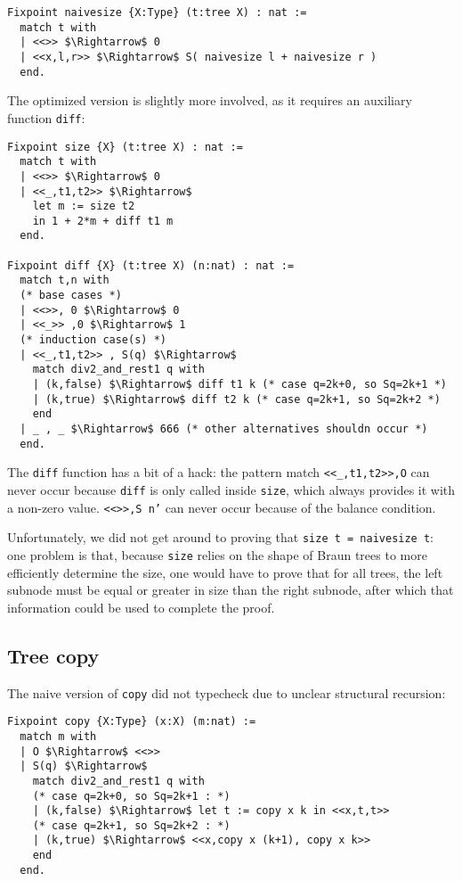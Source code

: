 \documentclass[a4paper,10pt]{article}
\begin{document}
\begin{lstlisting}[mathescape=true]
Fixpoint naivesize {X:Type} (t:tree X) : nat :=
  match t with
  | <<>> $\Rightarrow$ 0
  | <<x,l,r>> $\Rightarrow$ S( naivesize l + naivesize r )
  end.
\end{lstlisting}

The optimized version is slightly more involved, as it requires an auxiliary function \texttt{diff}:

\begin{lstlisting}[mathescape=true]
Fixpoint size {X} (t:tree X) : nat :=
  match t with
  | <<>> $\Rightarrow$ 0
  | <<_,t1,t2>> $\Rightarrow$ 
    let m := size t2 
    in 1 + 2*m + diff t1 m
  end.

Fixpoint diff {X} (t:tree X) (n:nat) : nat :=
  match t,n with
  (* base cases *)
  | <<>>, 0 $\Rightarrow$ 0
  | <<_>> ,0 $\Rightarrow$ 1
  (* induction case(s) *)
  | <<_,t1,t2>> , S(q) $\Rightarrow$ 
    match div2_and_rest1 q with
    | (k,false) $\Rightarrow$ diff t1 k (* case q=2k+0, so Sq=2k+1 *)
    | (k,true) $\Rightarrow$ diff t2 k (* case q=2k+1, so Sq=2k+2 *)
    end
  | _ , _ $\Rightarrow$ 666 (* other alternatives shouldn occur *)
  end.
\end{lstlisting}

The \texttt{diff} function has a bit of a hack: the pattern match \texttt{<<\_,t1,t2>>,O} can never occur because \texttt{diff} is only called inside \texttt{size}, which always provides it with a non-zero value.
\texttt{<<>>,S n'} can never occur because of the balance condition.

Unfortunately, we did not get around to proving that \texttt{size t = naivesize t}: one problem is that, because \texttt{size} relies on the shape of Braun trees to more efficiently determine the size, one would have to prove that for all trees, the left subnode must be equal or greater in size than the right subnode, after which that information could be used to complete the proof.

\subsection{Tree copy}

The naive version of \texttt{copy} did not typecheck due to unclear structural recursion:

\begin{lstlisting}[mathescape=true]
Fixpoint copy {X:Type} (x:X) (m:nat) :=
  match m with
  | O $\Rightarrow$ <<>>
  | S(q) $\Rightarrow$
    match div2_and_rest1 q with
    (* case q=2k+0, so Sq=2k+1 : *)
    | (k,false) $\Rightarrow$ let t := copy x k in <<x,t,t>>
    (* case q=2k+1, so Sq=2k+2 : *) 
    | (k,true) $\Rightarrow$ <<x,copy x (k+1), copy x k>>
    end
  end.
\end{lstlisting}
\end{document}

